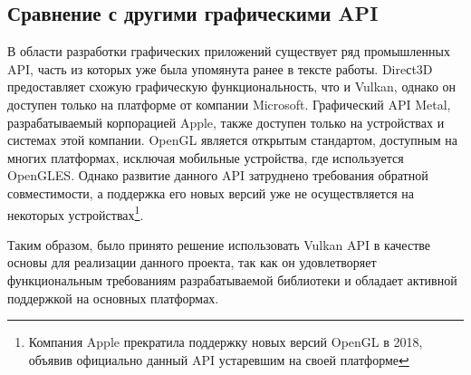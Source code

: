 \documentclass[14pt]{matmex-diploma}
\begin{document}
\subsection{Сравнение с другими графическими API}

В области разработки графических приложений существует ряд промышленных API, часть из которых уже была упомянута ранее в тексте работы. Direсt3D предоставляет схожую графическую функциональность, что и Vulkan, однако он доступен только на платформе от компании Microsoft. Графический API Metal, разрабатываемый корпорацией Apple, также доступен только на устройствах и системах этой компании. OpenGL является открытым стандартом, доступным на многих платформах, исключая мобильные устройства, где используется OpenGLES. Однако развитие данного API затруднено требования обратной совместимости, а поддержка его новых версий уже не осуществляется на некоторых устройствах\footnote{Компания Apple прекратила поддержку новых версий OpenGL в 2018, объявив официально данный API устаревшим на своей платформе}.       

Таким образом, было принято решение использовать Vulkan API в качестве основы для реализации данного проекта, так как он удовлетворяет функциональным требованиям разрабатываемой библиотеки и обладает активной поддержкой на основных платформах.




\end{document}
